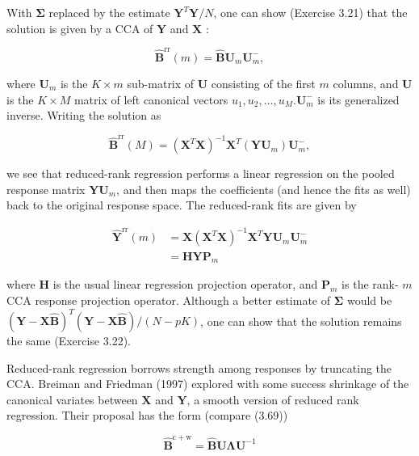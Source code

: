 \documentclass[10pt]{article}
\begin{document}
With $\boldsymbol{\Sigma}$ replaced by the estimate $\mathbf{Y}^{T} \mathbf{Y} / N$, one can show (Exercise 3.21) that the solution is given by a CCA of $\mathbf{Y}$ and $\mathbf{X}$ :


\begin{equation*}
\hat{\mathbf{B}}^{\mathrm{rr}}(m)=\hat{\mathbf{B}} \mathbf{U}_{m} \mathbf{U}_{m}^{-}, \tag{3.69}
\end{equation*}


where $\mathbf{U}_{m}$ is the $K \times m$ sub-matrix of $\mathbf{U}$ consisting of the first $m$ columns, and $\mathbf{U}$ is the $K \times M$ matrix of left canonical vectors $u_{1}, u_{2}, \ldots, u_{M} . \mathbf{U}_{m}^{-}$ is its generalized inverse. Writing the solution as


\begin{equation*}
\hat{\mathbf{B}}^{\mathrm{rr}}(M)=\left(\mathbf{X}^{T} \mathbf{X}\right)^{-1} \mathbf{X}^{T}\left(\mathbf{Y} \mathbf{U}_{m}\right) \mathbf{U}_{m}^{-}, \tag{3.70}
\end{equation*}


we see that reduced-rank regression performs a linear regression on the pooled response matrix $\mathbf{Y} \mathbf{U}_{m}$, and then maps the coefficients (and hence the fits as well) back to the original response space. The reduced-rank fits are given by


\begin{align*}
\hat{\mathbf{Y}}^{\mathrm{rr}}(m) & =\mathbf{X}\left(\mathbf{X}^{T} \mathbf{X}\right)^{-1} \mathbf{X}^{T} \mathbf{Y} \mathbf{U}_{m} \mathbf{U}_{m}^{-}  \tag{3.71}\\
& =\mathbf{H Y} \mathbf{P}_{m}
\end{align*}


where $\mathbf{H}$ is the usual linear regression projection operator, and $\mathbf{P}_{m}$ is the rank- $m$ CCA response projection operator. Although a better estimate of $\boldsymbol{\Sigma}$ would be $(\mathbf{Y}-\mathbf{X} \hat{\mathbf{B}})^{T}(\mathbf{Y}-\mathbf{X} \hat{\mathbf{B}}) /(N-p K)$, one can show that the solution remains the same (Exercise 3.22).

Reduced-rank regression borrows strength among responses by truncating the CCA. Breiman and Friedman (1997) explored with some success shrinkage of the canonical variates between $\mathbf{X}$ and $\mathbf{Y}$, a smooth version of reduced rank regression. Their proposal has the form (compare (3.69))


\begin{equation*}
\hat{\mathbf{B}}^{\mathrm{c}+\mathrm{w}}=\hat{\mathbf{B}} \mathbf{U} \boldsymbol{\Lambda} \mathbf{U}^{-1} \tag{3.72}
\end{equation*}
\end{document}
